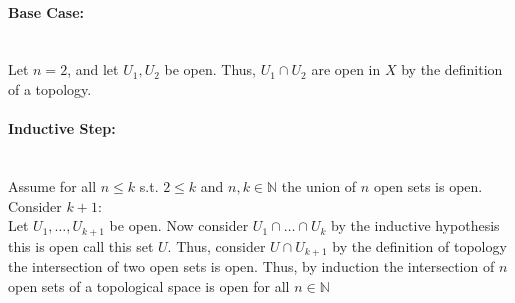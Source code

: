 \documentclass[12pt, letterpaper]{article}
\theoremstyle{definition}
\newcommand{\N}{\mathbb{N}}
\begin{document}
\paragraph*{Base Case:}
\phantom{text}\\
Let $n=2$, and let $U_1,U_2$ be open. Thus, $U_1 \cap U_2$ are open in $X$ by the definition of a topology.
\paragraph*{Inductive Step:}
\phantom{text}\\
Assume for all $n \leq k$ s.t. $2 \leq k$ and $n,k \in \N$ the union of $n$ open sets is open.\\
Consider $k+1$:\\
Let $U_1,\dots,U_{k+1}$ be open. Now consider $U_1 \cap \dots \cap U_k$ by the inductive hypothesis this is open call this set $U$. Thus, consider $U \cap U_{k+1}$ by the definition of topology the intersection of two open sets is open. Thus, by induction the intersection of $n$ open sets of a topological space is open for all $n \in \N$

\newpage
\end{document}
